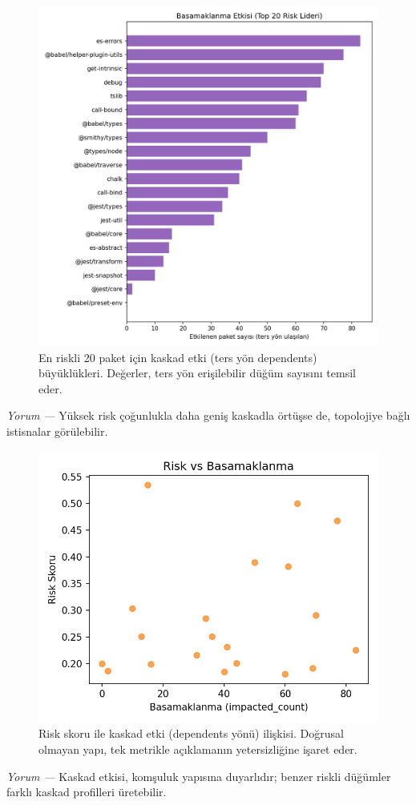 \documentclass[11pt,a4paper]{article}
\begin{document}
\begin{figure}[H]
  \centering
  \includegraphics{cascade_impact_top20.png}
  \caption{En riskli 20 paket için kaskad etki (ters yön dependents) büyüklükleri. Değerler, ters yön erişilebilir düğüm sayısını temsil eder.}
\end{figure}
\textit{Yorum —} Yüksek risk çoğunlukla daha geniş kaskadla örtüşse de, topolojiye bağlı istisnalar görülebilir.

\begin{figure}[H]
  \centering
  \includegraphics{risk_vs_cascade.png}
  \caption{Risk skoru ile kaskad etki (dependents yönü) ilişkisi. Doğrusal olmayan yapı, tek metrikle açıklamanın yetersizliğine işaret eder.}
\end{figure}
\textit{Yorum —} Kaskad etkisi, komşuluk yapısına duyarlıdır; benzer riskli düğümler farklı kaskad profilleri üretebilir.
\end{document}
